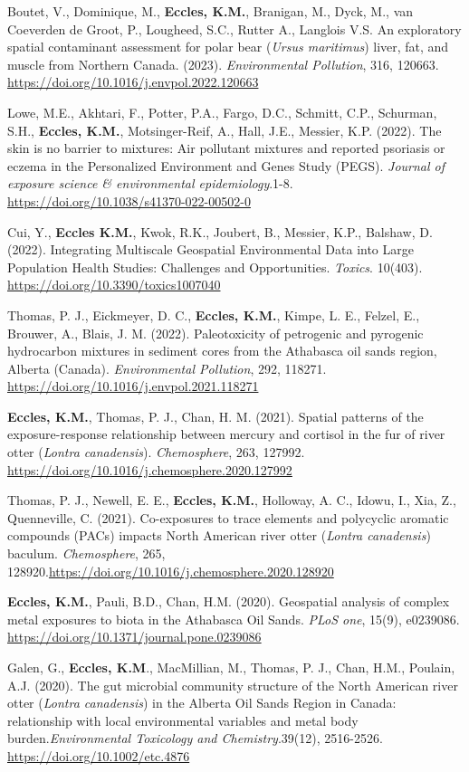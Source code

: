 \documentclass[margin,line]{res}
\begin{document}
\begin{resume}
Boutet, V., Dominique, M., \textbf{Eccles, K.M.}, Branigan, M., Dyck, M., van Coeverden de Groot, P., Lougheed, S.C., Rutter A., Langlois V.S. An exploratory spatial contaminant assessment for polar bear (\textit{Ursus maritimus}) liver, fat, and muscle from Northern Canada. (2023). \textit{Environmental Pollution}, 316, 120663. \url{https://doi.org/10.1016/j.envpol.2022.120663}

Lowe, M.E., Akhtari, F., Potter, P.A., Fargo, D.C., Schmitt, C.P., Schurman, S.H., \textbf{Eccles, K.M.}, Motsinger-Reif, A., Hall, J.E., Messier, K.P. (2022). The skin is no barrier to mixtures: Air pollutant mixtures and reported
psoriasis or eczema in the Personalized Environment and Genes Study (PEGS). \textit{Journal of exposure science \& environmental epidemiology}.1-8. \url{https://doi.org/10.1038/s41370-022-00502-0}

Cui, Y., \textbf{Eccles K.M.}, Kwok, R.K., Joubert, B., Messier, K.P., Balshaw, D. (2022). Integrating Multiscale Geospatial Environmental Data into Large Population Health Studies: Challenges and Opportunities. \textit{Toxics}. 10(403). \url{https://doi.org/10.3390/toxics1007040}

 Thomas, P. J., Eickmeyer, D. C., \textbf{Eccles, K.M.}, Kimpe, L. E., Felzel, E., Brouwer, A., Blais, J. M. (2022). Paleotoxicity of petrogenic and pyrogenic hydrocarbon mixtures in sediment cores from the Athabasca oil sands region, Alberta (Canada). \textit{Environmental Pollution}, 292, 118271. \url{https://doi.org/10.1016/j.envpol.2021.118271}

\textbf{Eccles, K.M.}, Thomas, P. J., Chan, H. M. (2021). Spatial patterns of the exposure-response relationship between mercury and cortisol in the fur of river otter (\textit{Lontra canadensis}). \textit{Chemosphere}, 263, 127992. \url{https://doi.org/10.1016/j.chemosphere.2020.127992}

Thomas, P. J., Newell, E. E., \textbf{Eccles, K.M.}, Holloway, A. C., Idowu, I., Xia, Z., Quenneville, C. (2021). Co-exposures to trace elements and polycyclic aromatic compounds (PACs) impacts North American river otter (\textit{Lontra canadensis}) baculum. \textit{Chemosphere}, 265, 128920.\url{https://doi.org/10.1016/j.chemosphere.2020.128920}

\textbf{Eccles, K.M.}, Pauli, B.D., Chan, H.M. (2020). Geospatial analysis of complex metal exposures to biota in the Athabasca Oil Sands. \textit{PLoS one}, 15(9), e0239086. \url{https://doi.org/10.1371/journal.pone.0239086}

Galen, G., \textbf{Eccles, K.M}., MacMillian, M., Thomas, P. J., Chan, H.M., Poulain, A.J. (2020). The gut microbial community structure of the North American river otter (\textit{Lontra canadensis}) in the Alberta Oil Sands Region in Canada: relationship with local environmental variables and metal body burden.\textit{Environmental Toxicology and Chemistry}.39(12), 2516-2526. \url{https://doi.org/10.1002/etc.4876}


\end{resume}
\end{document}
